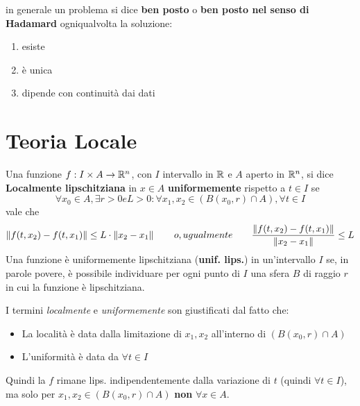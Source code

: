\begin{observation}
	\label{obs:hadamard}
	in generale un problema si dice \textbf{ben posto} o \textbf{ben posto nel senso di Hadamard} ogniqualvolta la soluzione:
	\begin{enumerate}
		\item esiste
		\item è unica
		\item dipende con continuità dai dati
	\end{enumerate}
\end{observation}

\section{Teoria Locale}
\begin{definition}
	\label{def:loc_lips}
	Una funzione $f:I\times A\to \mathbb{R}^n$, con $I$ intervallo in $\mathbb{R}$ e $A$ aperto in $\mathbb{R}^n$, si dice \textbf{Localmente lipschitziana} in $x\in A$ \textbf{uniformemente} rispetto a $t \in I$ se
	$$\forall x_0 \in A, \exists r>0 e L>0: \forall x_1,x_2 \in (B(x_0,r)\cap A), \forall t\in I$$
	vale che
	$$\left\|f(t,x_2)-f(t,x_1)\right\|\leq L\cdot\left\|x_2-x_1\right\|\qquad o, ugualmente\qquad\frac{\left\|f(t,x_2)-f(t,x_1)\right\|}{\left\|x_2-x_1\right\|}\leq L$$
	Una funzione è uniformemente lipschitziana (\textbf{unif. lips.}) in un'intervallo $I$ se, in parole povere, è possibile individuare per ogni punto di $I$ una sfera $B$ di raggio $r$ in cui la funzione è lipschitziana.
\end{definition}
\begin{note}
	I termini \textit{localmente} e \textit{uniformemente} son giustificati dal fatto che:
	\begin{itemize}
		\item La località è data dalla limitazione di $x_1,x_2$ all'interno di $(B(x_0,r)\cap A)$
		\item L'uniformità è data da $\forall t\in I$
	\end{itemize}
	Quindi la $f$ rimane lips. indipendentemente dalla variazione di $t$ (quindi $\forall t\in I$), ma solo per $x_1,x_2 \in (B(x_0,r)\cap A)$ \textbf{non} $\forall x\in A$.
\end{note}
